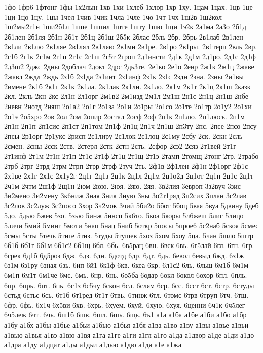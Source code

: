 {1фо
1фр6
1фтонг
1фы
1х2лын
1хв
1хи
1хлеб
1хлор
1хр
1ху.
1цам
1цах.
1цв
1це
1ци
1цо
1цу.
1цы
1чел
1чив
1чик
1чла
1чле
1чо
1чт
1чх
1ш2в
1ш2кол
1ш2мы2г1н
1ши2б1л
1шпе
1шпил
1ште
1шту
1шю
1щи
1э2к
2а1ма
2а3о
2б1д
2б1лен
2б1ля
2б1н
2б1т
2б1ц
2б1ш
2б5к
2блас
2бль
2бр.
2брь
2в1лаб
2в1лен
2в1ли
2в1лю
2в1ляе
2в1лял
2в1ляю
2в1ми
2в1ре.
2в1ро
2в1ры.
2в1терп
2вль
2вр.
2г1б
2г1к
2г1м
2г1п
2г1с
2г1ш
2г5т
2гроп
2д1инсти
2д1к
2д1м
2д1ро.
2д1с
2д1ф
2д3ш2
2джс
2дны
2доблач
2докт
2дрс
2дь3те.
2е1ко
2е1о
2енр
2ж1к
2ж1ц
2жаве
2жавл
2ждл
2ждь
2з1б
2з1да
2з1инт
2з1инф
2з1к
2з1с
2здн
2зна.
2зны
2и1вы
2имене
2к1б
2к1г
2к1к
2к1ла.
2к1лак
2к1ли.
2к1ло.
2к1м
2к1т
2к1ц
2к1ш
2казк
2кл.
2кль
2кн
2кс
2л1н
2л1орг
2м1в2
2м1изд
2м1л
2м1ш
2н1с
2н1ц
2н1ш
2нбе
2невн
2нотд
2няш
2о1а2
2о1г
2о1за
2о1и
2о1ры
2о1со
2о1те
2о1тр
2о1у2
2о1хи
2о1э
2о5хро
2ов
2ол
2ом
2опир
2остал
2осф
2оф
2п1к
2п1лю.
2п1люсь.
2п1м
2п1н
2п1п
2п1сис
2п1ст
2п1том
2п1ф
2п1ц
2п1ч
2п1ш
2п3ту
2пс.
2псе
2псо
2псу
2псы
2р1орг
2р1укс
2рисп
2с1лиру
2с1лок
2с1лоц
2с1му
2сбу
2ск.
2скн
2сль
2смен.
2сны
2сск
2ств.
2стерл
2стк
2стн
2сть.
2сфор
2сэ2
2сяз
2т1вей
2т1г
2т1инф
2т1м
2т1н
2т1п
2т1с
2т1ф
2т1ц
2т1щ
2т1э
2тамп
2томщ
2тонг
2тр.
2трабо
2трб
2трг
2трд
2трм
2трп
2трр
2трф
2туч
2ть.
2ф1в
2ф1лен
2ф1н
2ф1орг
2ф1с
2х1ве
2х1г
2х1с
2х1у2г
2ц1г
2ц1з
2ц1к
2ц1л
2ц1м
2ц1о2д
2ц1от
2ц1п
2ц1с
2ц1т
2ч1м
2чтм
2ш1ф
2щ1н
2юм
2юю.
2юя.
2яю.
2яя.
3в2лия
3европ
3з2вуч
3зис
3и2мено
3и2мену
3к6ниж
3ная
3ник
3ную
3ны
3о2т1ряд
3п2сих
3план
3с2лав
3с2лов
3с2луж
3с2посо
3хор
3ч2мок
3чий
5би2о
5бот
5боц
5вая
5вуа
5двину
5деб
5до.
5дью
5жев
5зо.
5зью
5инж
5инсп
5к6то.
5коа
5коры
5л6жеш
5лиг
5лицо
5личи
5мий
5минг
5моти
5нап
5нац
5ниб
5откр
5посы
5прое6
5с2наб
5скоя
5смес
5смы
5сты
5течь
5тиге
5тиз.
5туды
5тушев
5хоз
5хом
5хоу
5ца.
5чан
5шло
5штр
6б1б
6б1г
6б1м
6б1с2
6б1щ
6бл.
6бь.
6в5рац
6вн.
6вск
6вь.
6г5лай
6гл.
6гн.
6гр.
6грек
6д1б
6д5роз
6дж.
6дз.
6дн.
6дотд
6др.
6дт.
6дь.
6евол
6евыд
6жд.
6з1ж
6з1м
6з1ру
6зная
6зь.
6ип
6й1
6к1ф
6кв.
6кеа
6кр.
6л1с2
6ль.
6льш
6м1б
6м1м
6м1п
6м1т
6м1че
6мс.
6мь.
6нр.
6нь.
6о5ба
6одар
6окл
6окол
6охор
6пл.
6пль.
6пр.
6прь.
6пт.
6пь.
6с1з
6с5чу
6скон
6сл.
6слям
6ср.
6сс.
6сст
6ст.
6стр.
6студы
6стьд
6стьс
6сь.
6т1б
6т1ред
6т1т
6твь.
6тинж
6тл.
6томс
6трв
6труп
6тч.
6тш.
6фр.
6фь.
6х1ч
6х5ви
6хв.
6хрь.
6хуем.
6хуй.
6хую.
6хуя.
6ценни
6ч1к
6ч5лег
6ч5леж
6чт.
6чь.
6ш1б
6шв.
6шл.
6шь.
6щь.
6ъ1
а1а
а1ба
а1бе
а1би
а1бо
а1бр
а1бу
а1бх
а1бы
а1бье
а1бьи
а1бью
а1бья
а1бя
а1ва
а1во
а1ву
а1вы
а1вье
а1вьи
а1вью
а1вья
а1вэ
а1вю
а1вя
а1га
а1ге
а1ги
а1гл
а1го
а1да
а1двор
а1де
а1ди
а1до
а1дра
а1ду
а1дцат
а1ды
а1дьи
а1дью
а1дю
а1дя
а1е
а1жа
}
